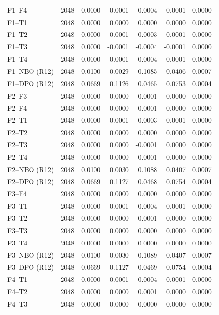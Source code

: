 \begin{longtable}{lrrrrrr}
F1--F4 & 2048 & 0.0000 & -0.0001 & -0.0004 & -0.0001 & 0.0000 \\
F1--T1 & 2048 & 0.0000 & 0.0000 & 0.0000 & 0.0000 & 0.0000 \\
F1--T2 & 2048 & 0.0000 & -0.0001 & -0.0003 & -0.0001 & 0.0000 \\
F1--T3 & 2048 & 0.0000 & -0.0001 & -0.0004 & -0.0001 & 0.0000 \\
F1--T4 & 2048 & 0.0000 & -0.0001 & -0.0004 & -0.0001 & 0.0000 \\
F1--NBO (R12) & 2048 & 0.0100 & 0.0029 & 0.1085 & 0.0406 & 0.0007 \\
F1--DPO (R12) & 2048 & 0.0669 & 0.1126 & 0.0465 & 0.0753 & 0.0004 \\
F2--F3 & 2048 & 0.0000 & 0.0000 & -0.0001 & 0.0000 & 0.0000 \\
F2--F4 & 2048 & 0.0000 & 0.0000 & -0.0001 & 0.0000 & 0.0000 \\
F2--T1 & 2048 & 0.0000 & 0.0001 & 0.0003 & 0.0001 & 0.0000 \\
F2--T2 & 2048 & 0.0000 & 0.0000 & 0.0000 & 0.0000 & 0.0000 \\
F2--T3 & 2048 & 0.0000 & 0.0000 & -0.0001 & 0.0000 & 0.0000 \\
F2--T4 & 2048 & 0.0000 & 0.0000 & -0.0001 & 0.0000 & 0.0000 \\
F2--NBO (R12) & 2048 & 0.0100 & 0.0030 & 0.1088 & 0.0407 & 0.0007 \\
F2--DPO (R12) & 2048 & 0.0669 & 0.1127 & 0.0468 & 0.0754 & 0.0004 \\
F3--F4 & 2048 & 0.0000 & 0.0000 & 0.0000 & 0.0000 & 0.0000 \\
F3--T1 & 2048 & 0.0000 & 0.0001 & 0.0004 & 0.0001 & 0.0000 \\
F3--T2 & 2048 & 0.0000 & 0.0000 & 0.0001 & 0.0000 & 0.0000 \\
F3--T3 & 2048 & 0.0000 & 0.0000 & 0.0000 & 0.0000 & 0.0000 \\
F3--T4 & 2048 & 0.0000 & 0.0000 & 0.0000 & 0.0000 & 0.0000 \\
F3--NBO (R12) & 2048 & 0.0100 & 0.0030 & 0.1089 & 0.0407 & 0.0007 \\
F3--DPO (R12) & 2048 & 0.0669 & 0.1127 & 0.0469 & 0.0754 & 0.0004 \\
F4--T1 & 2048 & 0.0000 & 0.0001 & 0.0004 & 0.0001 & 0.0000 \\
F4--T2 & 2048 & 0.0000 & 0.0000 & 0.0001 & 0.0000 & 0.0000 \\
F4--T3 & 2048 & 0.0000 & 0.0000 & 0.0000 & 0.0000 & 0.0000 \\

\end{longtable}
